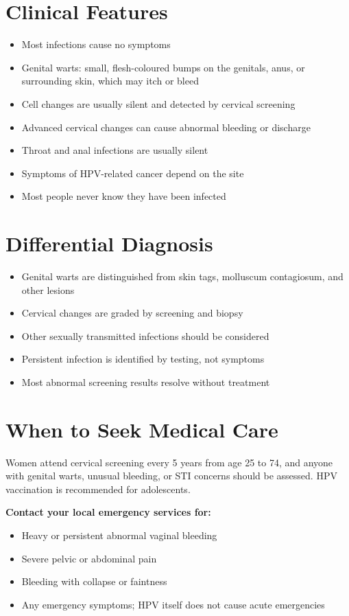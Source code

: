 \section*{Clinical Features}
\begin{itemize}
    \item Most infections cause no symptoms
    \item Genital warts: small, flesh-coloured bumps on the genitals, anus, or surrounding skin, which may itch or bleed
    \item Cell changes are usually silent and detected by cervical screening
    \item Advanced cervical changes can cause abnormal bleeding or discharge
    \item Throat and anal infections are usually silent
    \item Symptoms of HPV-related cancer depend on the site
    \item Most people never know they have been infected
\end{itemize}

\section*{Differential Diagnosis}
\begin{itemize}
    \item Genital warts are distinguished from skin tags, molluscum contagiosum, and other lesions
    \item Cervical changes are graded by screening and biopsy
    \item Other sexually transmitted infections should be considered
    \item Persistent infection is identified by testing, not symptoms
    \item Most abnormal screening results resolve without treatment
\end{itemize}

\section*{When to Seek Medical Care}
Women attend cervical screening every 5 years from age 25 to 74, and anyone with genital warts, unusual bleeding, or STI concerns should be assessed. HPV vaccination is recommended for adolescents.

\textbf{Contact your local emergency services for:}
\begin{itemize}
    \item Heavy or persistent abnormal vaginal bleeding
    \item Severe pelvic or abdominal pain
    \item Bleeding with collapse or faintness
    \item Any emergency symptoms; HPV itself does not cause acute emergencies
\end{itemize}

